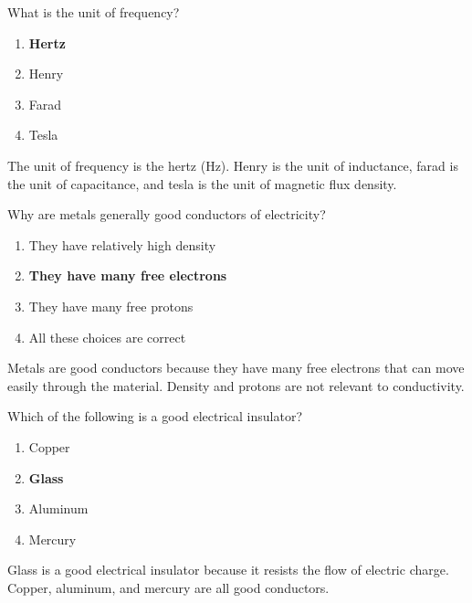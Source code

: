 
\begin{tcolorbox}[colback=gray!10!white,colframe=black!75!black,title={T5A06}]
What is the unit of frequency?
\begin{enumerate}[label=\Alph*),noitemsep]
    \item \textbf{Hertz}
    \item Henry
    \item Farad
    \item Tesla
\end{enumerate}
\end{tcolorbox}
The unit of frequency is the hertz (Hz). Henry is the unit of inductance, farad is the unit of capacitance, and tesla is the unit of magnetic flux density.


\begin{tcolorbox}[colback=gray!10!white,colframe=black!75!black,title={T5A07}]
Why are metals generally good conductors of electricity?
\begin{enumerate}[label=\Alph*),noitemsep]
    \item They have relatively high density
    \item \textbf{They have many free electrons}
    \item They have many free protons
    \item All these choices are correct
\end{enumerate}
\end{tcolorbox}
Metals are good conductors because they have many free electrons that can move easily through the material. Density and protons are not relevant to conductivity.


\begin{tcolorbox}[colback=gray!10!white,colframe=black!75!black,title={T5A08}]
Which of the following is a good electrical insulator?
\begin{enumerate}[label=\Alph*),noitemsep]
    \item Copper
    \item \textbf{Glass}
    \item Aluminum
    \item Mercury
\end{enumerate}
\end{tcolorbox}
Glass is a good electrical insulator because it resists the flow of electric charge. Copper, aluminum, and mercury are all good conductors.

